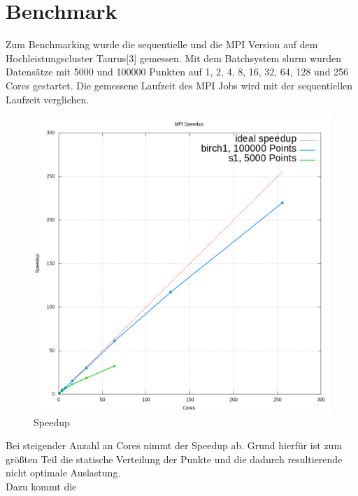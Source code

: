 \section{Benchmark}
	Zum Benchmarking wurde die sequentielle und die MPI Version auf dem Hochleistungscluster Taurus[3] gemessen. Mit dem Batchsystem slurm wurden Datensätze mit
	5000 und 100000 Punkten auf 1, 2, 4, 8, 16, 32, 64, 128 und 256 Cores gestartet. Die gemessene Laufzeit des MPI Jobs wird mit der sequentiellen
	Laufzeit verglichen.\\
	\begin{figure}[H] \centering
		\includegraphics[scale=0.61]{../meanshift/output/pics/speedup.png} 
		\caption{Speedup}
	\end{figure}
	Bei steigender Anzahl an Cores nimmt der Speedup ab. Grund hierfür ist zum größten Teil die statische Verteilung der Punkte und die dadurch
	resultierende nicht optimale Auslastung.\\
	Dazu kommt die 
	\newpage
